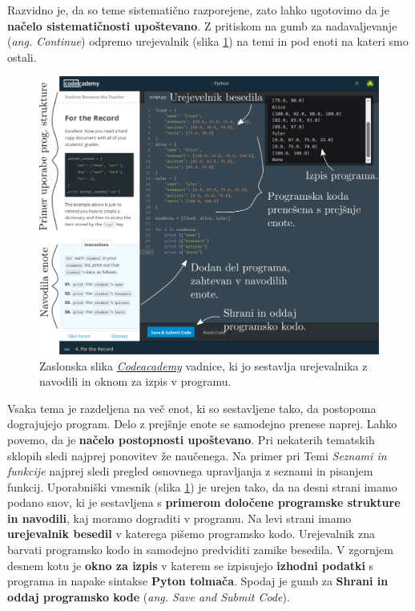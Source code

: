 Razvidno je, da so teme sistematično razporejene, zato lahko ugotovimo
da je \textbf{načelo sistematičnosti upoštevano}. Z pritiskom na gumb
za nadavaljevanje (\emph{ang. Continue}) odpremo urejevalnik (slika
\ref{fig:scr:web:codeacademy:ide}) na temi in pod enoti na kateri smo
ostali.

\begin{figure}[h!]
  \centering
    \includegraphics [width=0.65\linewidth, keepaspectratio =
   1] {./images/sc_web/codeacademy_IDE_02.png}
   \caption{Zaslonska slika
     \emph{\href{https://www.codecademy.com/}{Codeacademy}}
     \cite{web:codeacademy} vadnice, ki jo sestavlja urejevalnika z
     navodili in oknom za izpis v programu.}
    \label{fig:scr:web:codeacademy:ide}
\end{figure}

Vsaka tema je razdeljena na več enot, ki so sestavljene tako, da
postopoma dograjujejo program. Delo z prejšnje enote se samodejno
prenese naprej. Lahko povemo, da je \textbf{načelo postopnosti
upoštevano}. Pri nekaterih tematskih sklopih sledi najprej ponovitev že
naučenega. Na primer pri Temi \emph{Seznami in funkcije} najprej sledi
pregled osnovnega upravljanja z seznami in pisanjem funkcij.
Uporabniški vmesnik (slika \ref{fig:scr:web:codeacademy:ide}) je
urejen tako, da na desni strani imamo podano snov, ki je sestavljena s
\textbf{primerom določene programske strukture in navodili}, kaj
moramo dograditi v programu. Na levi strani imamo \textbf{urejevalnik
  besedil} v katerega pišemo programsko kodo. Urejevalnik zna barvati
programsko kodo in samodejno predviditi zamike besedila. V zgornjem
desnem kotu je \textbf{okno za izpis} v katerem se izpisujejo
\textbf{izhodni podatki} s programa in napake sintakse \textbf{Pyton
  tolmača}. Spodaj je gumb za \textbf{Shrani in oddaj programsko kode}
(\emph{ang. Save and Submit Code}).

